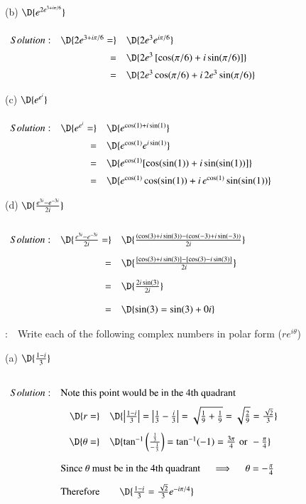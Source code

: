 \documentclass[11pt]{article}
\begin{document}
(b) $\D{e^{2e^{3+i\pi/6}}}$

$
\setlength{\extrarowheight}{0.2cm}
\begin{array}{rrl}
	Solution: & \D{2e^{3+i\pi/6} =} & \D{2e^{3}e^{i\pi/6}} \\
	&=&\D{2e^{3}\left[\cos (\pi/6) + i \sin (\pi/6)\right]}\\
	&=&\D{2e^{3}\cos (\pi/6) + i \,2e^{3}\sin (\pi/6)}\\
\end{array}
$

(c) $\D{e^{e^{i}}}$

$
\setlength{\extrarowheight}{0.2cm}
\begin{array}{rrl}
	Solution: & \D{e^{e^{i}} =} & \D{e^{\cos (1) + i \sin (1)}} \\
	&=&\D{e^{\cos (1)} e^{i \sin (1)}} \\
	&=&\D{e^{\cos (1)} [\cos (\sin (1)) + i \sin (\sin (1))]} \\
	&=&\D{e^{\cos (1)} \cos (\sin (1)) + i \, e^{\cos (1)}\sin (\sin (1))} \\
\end{array}
$

\newpage
\thispagestyle{empty}

(d) $\D{\frac{e^{3i}-e^{-3i}}{2i}}$

$
\setlength{\extrarowheight}{0.4cm}
\begin{array}{rrl}
	Solution: & \D{\frac{e^{3i}-e^{-3i}}{2i} =} & \D{\frac{(\cos (3) + i \sin (3)) - (\cos (-3) + i \sin (-3))}{2i}} \\
	&=&\D{\frac{[\cos (3) + i \sin (3)] - [\cos (3) - i \sin (3)]}{2i}} \\
	&=&\D{\frac{ 2 i \sin (3)}{2i}} \\
	&=&\D{\sin(3) = \sin(3) + 0i} \\
\end{array}
$

\vspace{0.4cm}

: \,\, Write each of the following complex numbers in polar form ($re^{i\theta}$)

\vspace{0.2cm}

(a) $\D{\frac{1-i}{3}}$ 

$
\setlength{\extrarowheight}{0.4cm}
\begin{array}{rrl}
	Solution: & \multicolumn{2}{l}{\text{Note this point would be in the 4th quadrant}} \\
	& \D{r =} & \D{\left|\frac{1-i}{3}\right| = \left|\frac{1}{3}-\frac{i}{3}\right| = \sqrt{\frac{1}{9}+\frac{1}{9}} = \sqrt{\frac{2}{9}} = \frac{\sqrt{2}}{3}} \\
	& \D{\theta =} & \D{\tan^{-1}\left(\frac{\frac{1}{3}}{-\frac{1}{3}}\right) = \tan^{-1}(-1) = \frac{3\pi}{4} \,\,\text{or}\,\, -\frac{\pi}{4} } \\
	& \multicolumn{2}{l}{\text{Since $\theta$ must be in the 4th quadrant $\quad \implies \quad \theta = -\frac{\pi}{4}$ }} \\
	& \text{Therefore} & \quad \D{\frac{1-i}{3} = \frac{\sqrt{2}}{3}e^{-i\pi/4}} \\
\end{array}
$
\end{document}
